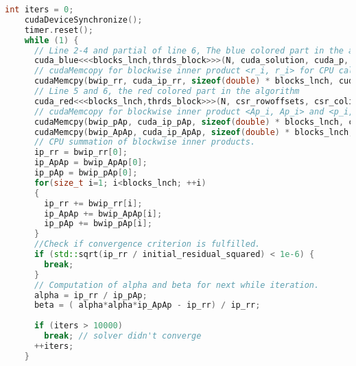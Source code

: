 \begin{lstlisting}[language=C++, title=CG \fun{while(){}} loop]
    int iters = 0;
    cudaDeviceSynchronize();
    timer.reset();
    while (1) {
      // Line 2-4 and partial of line 6, The blue colored part in the algorithm:
      cuda_blue<<<blocks_lnch,thrds_block>>>(N, cuda_solution, cuda_p, cuda_Ap, cuda_r, cuda_ip_rr, alpha, beta);
      // cudaMemcopy for blockwise inner product <r_i, r_i> for CPU calculations of alpha and beta
      cudaMemcpy(bwip_rr, cuda_ip_rr, sizeof(double) * blocks_lnch, cudaMemcpyDeviceToHost);
      // Line 5 and 6, the red colored part in the algorithm
      cuda_red<<<blocks_lnch,thrds_block>>>(N, csr_rowoffsets, csr_colindices, csr_values, cuda_p, cuda_Ap, cuda_ip_ApAp, cuda_ip_pAp);
      // cudaMemcopy for blockwise inner product <Ap_i, Ap_i> and <p_i, Ap_i> for CPU calculations of alpha and beta
      cudaMemcpy(bwip_pAp, cuda_ip_pAp, sizeof(double) * blocks_lnch, cudaMemcpyDeviceToHost);
      cudaMemcpy(bwip_ApAp, cuda_ip_ApAp, sizeof(double) * blocks_lnch, cudaMemcpyDeviceToHost);
      // CPU summation of blockwise inner products.
      ip_rr = bwip_rr[0];
      ip_ApAp = bwip_ApAp[0];
      ip_pAp = bwip_pAp[0];
      for(size_t i=1; i<blocks_lnch; ++i)
      {
        ip_rr += bwip_rr[i];
        ip_ApAp += bwip_ApAp[i];
        ip_pAp += bwip_pAp[i];
      }
      //Check if convergence criterion is fulfilled.
      if (std::sqrt(ip_rr / initial_residual_squared) < 1e-6) {
        break;
      }
      // Computation of alpha and beta for next while iteration.
      alpha = ip_rr / ip_pAp;
      beta = ( alpha*alpha*ip_ApAp - ip_rr) / ip_rr;
   
      if (iters > 10000)
        break; // solver didn't converge
      ++iters;
    }
    \end{lstlisting}
    
\pagebreak